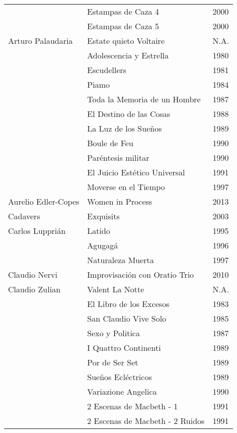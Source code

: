 \begin{center}
\begin{longtable}{ p{}  p{}  p{} }
& Estampas de Caza 4 & 2000 \\ \cmidrule (r){2-3} 
& Estampas de Caza 5 & 2000 \\ \midrule 
Arturo Palaudaria & Estate quieto Voltaire & N.A. \\ \cmidrule (r){2-3} 
& Adolescencia y Estrella & 1980 \\ \cmidrule (r){2-3} 
& Escudellers & 1981 \\ \cmidrule (r){2-3} 
& Piamo & 1984 \\ \cmidrule (r){2-3} 
& Toda la Memoria de un Hombre & 1987 \\ \cmidrule (r){2-3} 
& El Destino de las Cosas & 1988 \\ \cmidrule (r){2-3} 
& La Luz de los Sueños & 1989 \\ \cmidrule (r){2-3} 
& Boule de Feu & 1990 \\ \cmidrule (r){2-3} 
& Paréntesis militar & 1990 \\ \cmidrule (r){2-3} 
& El Juicio Estético Universal & 1991 \\ \cmidrule (r){2-3} 
& Moverse en el Tiempo & 1997 \\ \midrule 
Aurelio Edler-Copes & Women in Process & 2013 \\ \midrule 
Cadavers & Exquisits & 2003 \\ \midrule 
Carlos Lupprián & Latido & 1995 \\ \cmidrule (r){2-3} 
& Agugagá & 1996 \\ \cmidrule (r){2-3} 
& Naturaleza Muerta & 1997 \\ \midrule 
Claudio Nervi & Improvisación con Oratio Trio & 2010 \\ \midrule 
Claudio Zulian & Valent La Notte & N.A. \\ \cmidrule (r){2-3} 
& El Libro de los Excesos & 1983 \\ \cmidrule (r){2-3} 
& San Claudio Vive Solo & 1985 \\ \cmidrule (r){2-3} 
& Sexo y Politica & 1987 \\ \cmidrule (r){2-3} 
& I Quattro Continenti & 1989 \\ \cmidrule (r){2-3} 
& Por de Ser Set & 1989 \\ \cmidrule (r){2-3} 
& Sueños Ecléctricos & 1989 \\ \cmidrule (r){2-3} 
& Variazione Angelica & 1990 \\ \cmidrule (r){2-3} 
& 2 Escenas de Macbeth - 1 & 1991 \\ \cmidrule (r){2-3} 
& 2 Escenas de Macbeth - 2 Ruidos & 1991 \\ \midrule 

\end{longtable}
\end{center}

